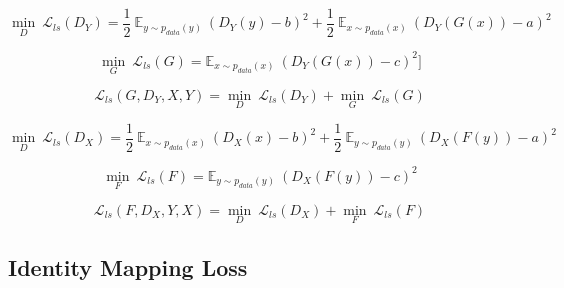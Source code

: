 





    \begin{equation}\label{lsgan1}
        \underset{D}{\min}\ \mathcal{L}_{ls}(D_Y) = \frac{1}{2}\ \mathbb{E}_{y \sim p_{data}(y)}\ (D_Y(y) - b)^2 + 
        \frac{1}{2}\ \mathbb{E}_{x \sim p_{data}(x)}\ (D_Y(G(x)) - a)^2
    \end{equation}
    
    \begin{equation}\label{lsgan2}
        \underset{G}{\min}\ \mathcal{L}_{ls}(G) = \mathbb{E}_{x \sim p_{data}(x)}\ (D_Y(G(x)) - c)^2]
    \end{equation}
    
    \begin{equation}\label{lsgan3}
    \mathcal{L}_{ls}(G, D_Y, X, Y) =  \underset{D}{\min}\ \mathcal{L}_{ls}(D_Y) + \underset{G}{\min}\ \mathcal{L}_{ls}(G)
    \end{equation}
    
    \begin{equation}\label{lsgan4}
        \underset{D}{\min}\ \mathcal{L}_{ls}(D_X) = \frac{1}{2}\ \mathbb{E}_{x \sim p_{data}(x)}\ (D_X(x) - b)^2 + 
        \frac{1}{2}\ \mathbb{E}_{y \sim p_{data}(y)}\ (D_X(F(y)) - a)^2
    \end{equation}
    
    \begin{equation}\label{lsgan5}        
        \underset{F}{\min}\ \mathcal{L}_{ls}(F) = \mathbb{E}_{y \sim p_{data}(y)}\ (D_X(F(y)) - c)^2
    \end{equation}
    
    
    \begin{equation}\label{lsgan6}        
        \mathcal{L}_{ls}(F, D_X, Y, X) = \underset{D}{\min}\ \mathcal{L}_{ls}(D_X) + \underset{F}{\min}\ \mathcal{L}_{ls}(F)
    \end{equation}
    



	    


\subsection{Identity Mapping Loss}

